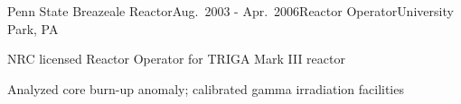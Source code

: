 

\begin{rSubsection}{Penn State Breazeale Reactor}{Aug.\ 2003 - Apr.\ 2006}{Reactor Operator}{University Park, PA}
\item NRC licensed Reactor Operator for TRIGA Mark III reactor
\item Analyzed core burn-up anomaly; calibrated gamma irradiation facilities
\end{rSubsection}
